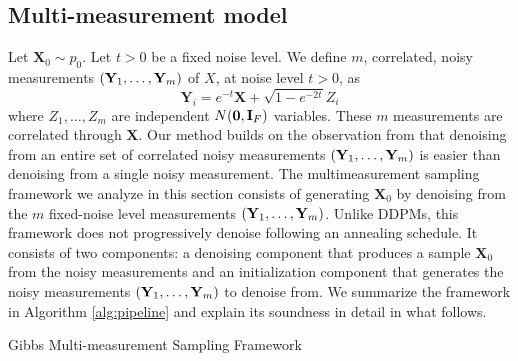 \subsection{Multi-measurement model}
Let $\mathbf{X}_0 \sim p_0$. Let $t>0$ be a fixed noise level. We define $m$, correlated, noisy measurements $\mathopen{}\left(\mathbf{Y}_1, \dots, \mathbf{Y}_m\right)$ of $X$, at noise level $t >0$, as
\begin{equation}
\mathbf{Y}_i = e^{-t} \mathbf{X} + \sqrt{1 - e^{-2t}} Z_i
\label{eq:multimeasure}
\end{equation}
where $Z_1, \dots, Z_m$ are independent $N\mathopen{}\left(\mathbf{0}, \mathbf{I}_F\right)$ variables. These $m$ measurements are correlated through $\mathbf{X}$. Our method builds on the observation from \cite{saremi_multimeasurement_2022} that denoising from an entire set of correlated noisy measurements $\mathopen{}\left(\mathbf{Y}_1, \dots, \mathbf{Y}_m\right)$ is easier than denoising from a single noisy measurement. The multimeasurement sampling framework we analyze in this section consists of generating $\mathbf{X}_0$ by denoising from the $m$ fixed-noise level measurements $\mathopen{}\left(\mathbf{Y}_1, \dots, \mathbf{Y}_m\right)$. Unlike DDPMs, this framework does not progressively denoise following an annealing schedule. It consists of two components: a denoising component that produces a sample $\mathbf{X}_0$ from the noisy measurements and an initialization component that generates the noisy measurements $\mathopen{}\left(\mathbf{Y}_1, \dots, \mathbf{Y}_m\right)$ to denoise from. We summarize the framework in Algorithm \ref{alg:pipeline} and explain its soundness in detail in what follows.

\begin{algorithm}[H]
\caption{Gibbs Multi-measurement Sampling Framework}
\label{alg:pipeline}
\begin{algorithmic}
\ENDFOR
{}
\end{algorithmic}
\end{algorithm}

